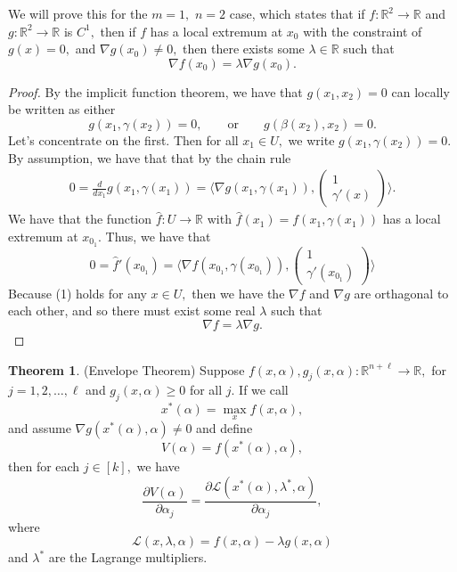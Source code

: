 \documentclass[10pt, oneside]{article}
\newcommand{\bbR}{\mathbb{R}}
\theoremstyle{definition}
\newtheorem{thm}{Theorem}
\begin{document}
We will prove this for the $m = 1,$ $n=2$ case, which states that if $f: \bbR^2 \to \bbR$ and $g: \bbR^2 \to \bbR$ is $C^1,$ then if $f$ has a local extremum at $x_0$ with the constraint of $g(x) = 0,$ and $\nabla g(x_0) \neq 0,$ then there exists some $\lambda \in \bbR$ such that 
\[\nabla f(x_0) = \lambda \nabla g(x_0).\]
\begin{proof}
    By the implicit function theorem, we have that $g(x_1, x_2) = 0$ can locally be written as either 
    \[g(x_1, \gamma(x_2)) =0, \qquad \text{or}\qquad g(\beta(x_2), x_2) = 0.\] Let's concentrate on the first. Then for all $x_1 \in U,$ we write $g(x_1, \gamma(x_2)) = 0.$ By assumption, we have that that by the chain rule
    \begin{align}
        0 = \frac{d}{dx_1}g(x_1, \gamma(x_1)) = \langle 
    \nabla g(x_1, \gamma(x_1)), \begin{pmatrix}
        1 \\ \gamma'(x)
    \end{pmatrix}
    \rangle.
    \end{align} We have that the function $\hat{f}: U \to \bbR$ with $\hat{f}(x_1) = f(x_1, \gamma(x_1))$ has a local extremum at $x_{0_1}.$ Thus, we have that 
    \[0 = \hat{f}'(x_{0_{1}}) = \langle \nabla f(x_{0_1}, \gamma(x_{0_1})), \begin{pmatrix}
        1 \\ \gamma'(x_{0_1})
    \end{pmatrix}\rangle\] Because (1) holds for any $x\in U,$ then we have the $\nabla f$ and $\nabla g$ are orthagonal to each other, and so there must exist some real $\lambda$ such that 
    \[\nabla f = \lambda \nabla g.\]
\end{proof}
\begin{thm} (Envelope Theorem)
    Suppose $f(x, \alpha), g_j(x,\alpha): \bbR^{n + \ell} \to \bbR,$ for $j = 1, 2,\dots, \ell$ and $g_j(x,\alpha) \geq 0$ for all $j$. If we call 
    \[x^*(\alpha) = \max_xf(x, \alpha),\] and assume $\nabla g(x^*(\alpha), \alpha) \neq 0$ and define
    \[V(\alpha)= f(x^*(\alpha), \alpha),\] then for each $j \in [k],$ we have 
    \[\frac{\partial V(\alpha)}{\partial \alpha_j} = \frac{\partial \mathcal{L}(x^*(\alpha), \lambda^*, \alpha)}{\partial \alpha_j},\] where 
    \[\mathcal{L}(x, \lambda, \alpha) = f(x, \alpha) - \lambda g(x, \alpha)\] and $\lambda^*$ are the Lagrange multipliers. 
\end{thm}
\end{document}
